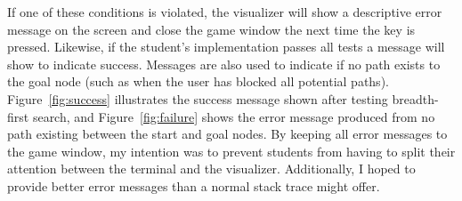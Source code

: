 \documentclass[pageno]{jpaper}
\begin{document}
If one of these conditions is violated, the visualizer will show a descriptive error message on the screen and close the game window the next time the  key is pressed. Likewise, if the student's implementation passes all tests a message will show to indicate success. Messages are also used to indicate if no path exists to the goal node (such as when the user has blocked all potential paths). Figure~\ref{fig:success} illustrates the success message shown after testing breadth-first search, and Figure~\ref{fig:failure} shows the error message produced from no path existing between the start and goal nodes. By keeping all error messages to the game window, my intention was to prevent students from having to split their attention between the terminal and the visualizer. Additionally, I hoped to provide better error messages than a normal stack trace might offer.
\end{document}
